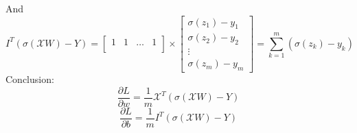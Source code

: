 \documentclass{article}
\begin{document}
    And 
    \[
        I^{T}\left(\sigma\left(\mathcal{X}W\right) - Y \right) = 
        \begin{bmatrix}
            1 & 1 & \hdots & 1 \\
        \end{bmatrix} \times
        \begin{bmatrix}
            \sigma\left(z_1\right) - y_1 \\
            \sigma\left(z_2\right) - y_2 \\
            \vdots  \\
            \sigma\left(z_m\right) - y_m
        \end{bmatrix} = \sum_{k=1}^{m}\left(
            \sigma(z_k) - y_k  
        \right)
    \]
    Conclusion:
    \[
        \frac{\partial L}{\partial w} = 
        \frac{1}{m}\mathcal{X}^{T}\left(\sigma\left(\mathcal{X}W\right) - Y \right)
    \]
    \[
        \frac{\partial L}{\partial b} = 
        \frac{1}{m}I^{T}\left(\sigma\left(\mathcal{X}W\right) - Y \right)
    \]
\end{document}
